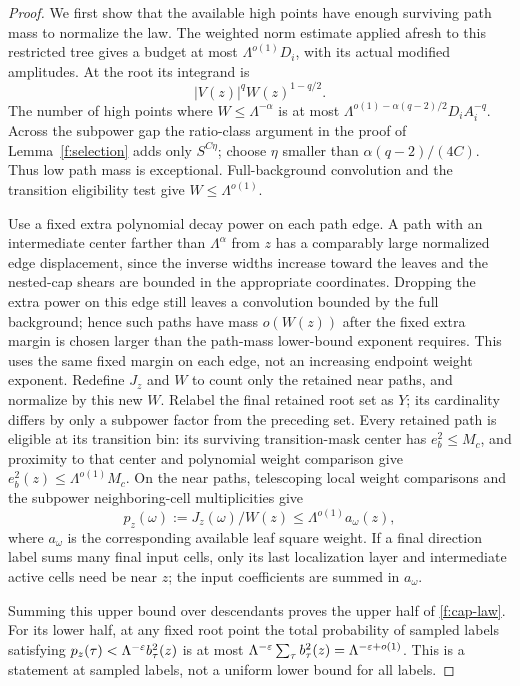 \begin{proof}
We first show that the available high points have enough surviving
path mass to normalize the law.
The weighted norm estimate applied afresh to this restricted tree
gives a budget at most $\Lambda^{o(1)}D_i$, with its actual modified
amplitudes. At the root its integrand is
\[
 |V(z)|^q W(z)^{1-q/2}.
\]
The number of high points where $W\le\Lambda^{-\alpha}$ is at most
$\Lambda^{o(1)-\alpha(q-2)/2}D_iA_i^{-q}$. Across the subpower gap
the ratio-class argument in the proof of Lemma~\ref{f:selection}
adds only $S^{C\eta}$; choose $\eta$ smaller than
$\alpha(q-2)/(4C)$. Thus low path mass is exceptional. Full-background
convolution and the transition eligibility test give
$W\le\Lambda^{o(1)}$.

Use a fixed extra polynomial decay power on each path edge. A path
with an intermediate center farther than $\Lambda^\alpha$ from $z$
has a comparably large normalized edge displacement, since the
inverse widths increase toward the leaves and the nested-cap shears
are bounded in the appropriate coordinates. Dropping the extra
power on this edge still leaves a convolution bounded by the full
background; hence such paths have mass $o(W(z))$ after the fixed
extra margin is chosen larger than the path-mass lower-bound
exponent requires. This uses the same fixed margin on each edge,
not an increasing endpoint weight exponent. Redefine $J_z$ and $W$
to count only the retained near paths, and normalize by this new
$W$. Relabel the final retained root set as $Y$; its cardinality
differs by only a subpower factor from the preceding set. Every
retained path is eligible at its transition bin: its surviving
transition-mask center has $e_b^2\le M_c$, and proximity to that
center and polynomial weight comparison give
$e_b^2(z)\le\Lambda^{o(1)}M_c$. On the near paths, telescoping local
weight comparisons and the subpower neighboring-cell multiplicities
give
\[
 p_z(\omega):=J_z(\omega)/W(z)
       \le\Lambda^{o(1)}a_\omega(z),
\]
where $a_\omega$ is the corresponding available leaf square weight.
If a final direction label sums many final input cells, only its
last localization layer and intermediate active cells need be near
$z$; the input coefficients are summed in $a_\omega$.

Summing this upper bound over descendants proves the upper half of
\eqref{f:cap-law}. For its lower half, at any fixed root point the
total probability of sampled labels satisfying
$p_z(\tau)<\Lambda^{-\varepsilon}b_\tau^2(z)$ is at most
$\Lambda^{-\varepsilon}\sum_\tau b_\tau^2(z)=\Lambda^{-\varepsilon+o(1)}$.
This is a statement at sampled labels, not a uniform lower bound
for all labels.


\end{proof}

